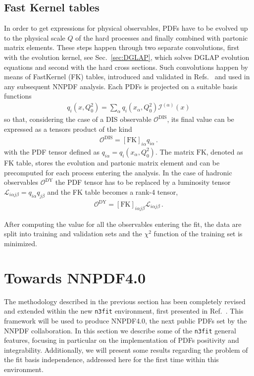 \subsection{Fast Kernel tables}
\label{sec:FK_nnpdf}
In order to get expressions for physical observables, PDFs have to be
evolved up to the physical scale $Q$ of the hard processes and finally 
combined with partonic matrix elements. These steps happen through two separate convolutions, first with
the evolution kernel, see Sec.~\ref{sec:DGLAP}, which solves DGLAP evolution equations and second with the hard cross sections.
Such convolutions happen by means of FastKernel (FK) tables, introduced and validated in Refs.~\cite{Ball:2010de,Bertone:2016lga}
and used in any subsequent NNPDF analysis.
Each PDFs is projected on a suitable basis functions
\begin{align}
    \label{eq:pdf_interpolation_basis}
    q_i\left(x,Q_0^2\right) = \sum_{\alpha}q_i\left(x_{\alpha},Q_0^2\right)\mathcal{I}^{(\alpha)}\left(x\right) 
\end{align}
so that, considering the case of a DIS observable $\mathcal{O}^{\text{DIS}}$, its final value 
can be expressed as a tensors product of the kind  
\begin{align}
    \label{eq:DIS_obs}
    \mathcal{O}^{\text{DIS}} = \left[\text{FK}\right]_{i\alpha}q_{i\alpha}\,.
\end{align}
with the PDF tensor defined as $q_{i\alpha} = q_i\left(x_{\alpha},Q_0^2\right)$.
The matrix $\text{FK}$, denoted as FK table, stores the evolution and partonic matrix element 
and can be precomputed for each process entering the analysis.
In the case of hadronic observables $\mathcal{O}^{\text{DY}}$ 
the PDF tensor has to be replaced by a luminosity tensor $\mathcal{L}_{i\alpha j\beta} = q_{i\alpha}q_{j\beta}$ 
and the FK table becomes a rank-4 tensor,
\begin{align}
    \label{eq:DY_obs}
    \mathcal{O}^{\text{DY}} = \left[\text{FK}\right]_{i\alpha j\beta}\mathcal{L}_{i\alpha j\beta}\,.
\end{align}

%
After computing the value for all the observables entering the fit, the data are split into training and 
validation sets and the $\chi^2$ function of the training set is minimized.



\section{Towards NNPDF4.0}
\label{sec:n3fit}
The methodology described in the previous section has been completely revised and extended within the new
{\tt n3fit} environment, first presented in Ref.~\cite{Carrazza:2019mzf}.
This framework will be used to produce NNPDF4.0, the next public PDFs set by the NNPDF collaboration.
In this section we describe some of the {\tt n3fit} general features, focusing in particular
on the implementation of PDFs positivity and integrability. 
Additionally, we will present some results regarding the problem of the fit basis independence,
addressed here for the first time within this environment.

